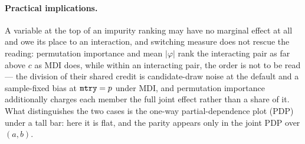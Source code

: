 \paragraph{Practical implications.} A variable at the top of an impurity
ranking may have no marginal effect at all and owe its place to an interaction,
and switching measure does not rescue the reading: permutation importance and
mean $|\varphi|$ rank the interacting pair as far above $c$ as MDI does, while
within an interacting pair, the order is not to be read --- the division of
their shared credit is candidate-draw noise at the default  and a
sample-fixed bias at $\texttt{mtry} = p$ under MDI, and permutation importance
additionally charges each member the full joint effect rather than a share of
it.
What distinguishes the two cases is the one-way
partial-dependence plot (PDP) under a tall bar: here it is flat, and the parity
appears only in the joint PDP over $(a,b)$.


